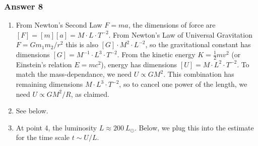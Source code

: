 \documentclass[11pt]{article}
\begin{document}
     
\subsubsection{Answer 8}\label{answer-8}

\begin{enumerate}
\def\labelenumi{\alph{enumi}.}
\item
  From Newton's Second Law \(F=ma\), the dimensions of force are
  \([F]=[m][a]=M \cdot L \cdot T^{-2}\). From Newton's Law of Universal
  Gravitation \(F=Gm_1m_2/r^2\) this is also
  \([G]\cdot M^2\cdot L^{-2}\), so the gravitational constant has
  dimensions \([G]=M^{-1}\cdot L^3 \cdot T^{-2}\). From the kinetic
  energy \(K=\frac12 mv^2\) (or Einstein's relation \(E=mc^2\)), energy
  has dimensions \([U]=M\cdot L^2 \cdot T^{-2}\). To match the
  mass-dependance, we need \(U\propto GM^2\). This combination has
  remaining dimensions \(M\cdot L^3\cdot T^{-2}\), so to cancel one
  power of the length, we need \(U\propto GM^2/R\), as claimed.
\item
  See below.
\item
  At point 4, the luminosity \(L\approx 200\ L_\odot\). Below, we plug
  this into the estimate for the time scale \(t \sim U/L\).
\end{enumerate}
 
\end{document}
